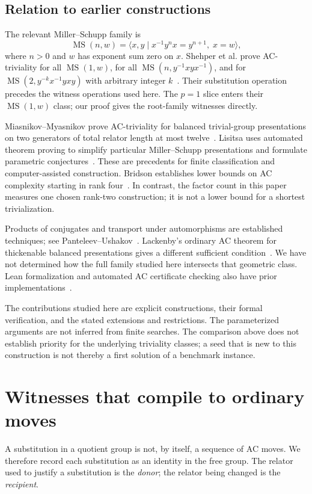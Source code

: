 \documentclass[11pt]{article}
\theoremstyle{definition}\newtheorem{definition}[theorem]{Definition}
\theoremstyle{remark}\newtheorem{remark}[theorem]{Remark}
\begin{document}
\subsection*{Relation to earlier constructions}
The relevant Miller--Schupp family is
\[
\operatorname{MS}(n,w)=\langle x,y\mid x^{-1}y^nx=y^{n+1},\;x=w\rangle,
\]
where $n>0$ and $w$ has exponent sum zero on $x$. Shehper et al. prove AC-triviality for all $\operatorname{MS}(1,w)$, for all $\operatorname{MS}(n,y^{-1}xyx^{-1})$, and for $\operatorname{MS}(2,y^{-k}x^{-1}yxy)$ with arbitrary integer $k$~\cite[Theorem B; Theorems 2, 3 and Corollary 9]{shehper}. Their substitution operation precedes the witness operations used here. The $p=1$ slice enters their $\operatorname{MS}(1,w)$ class; our proof gives the root-family witnesses directly.

Miasnikov--Myasnikov prove AC-triviality for balanced trivial-group presentations on two generators of total relator length at most twelve~\cite{miasnikov}. Lisitsa uses automated theorem proving to simplify particular Miller--Schupp presentations and formulate parametric conjectures~\cite{lisitsa}. These are precedents for finite classification and computer-assisted construction. Bridson establishes lower bounds on AC complexity starting in rank four~\cite{bridson}. In contrast, the factor count in this paper measures one chosen rank-two construction; it is not a lower bound for a shortest trivialization.

Products of conjugates and transport under automorphisms are established techniques; see Panteleev--Ushakov~\cite{panteleev}. Lackenby's ordinary AC theorem for thickenable balanced presentations gives a different sufficient condition~\cite[Theorem 1.3]{lackenby}. We have not determined how the full family studied here intersects that geometric class. Lean formalization and automated AC certificate checking also have prior implementations~\cite{zhang,sair}.

The contributions studied here are explicit constructions, their formal verification, and the stated extensions and restrictions. The parameterized arguments are not inferred from finite searches. The comparison above does not establish priority for the underlying triviality classes; a seed that is new to this construction is not thereby a first solution of a benchmark instance.

\pagebreak[2]
\section{Witnesses that compile to ordinary moves}
A substitution in a quotient group is not, by itself, a sequence of AC moves. We therefore record each substitution as an identity in the free group. The relator used to justify a substitution is the \emph{donor}; the relator being changed is the \emph{recipient}.
\end{document}
